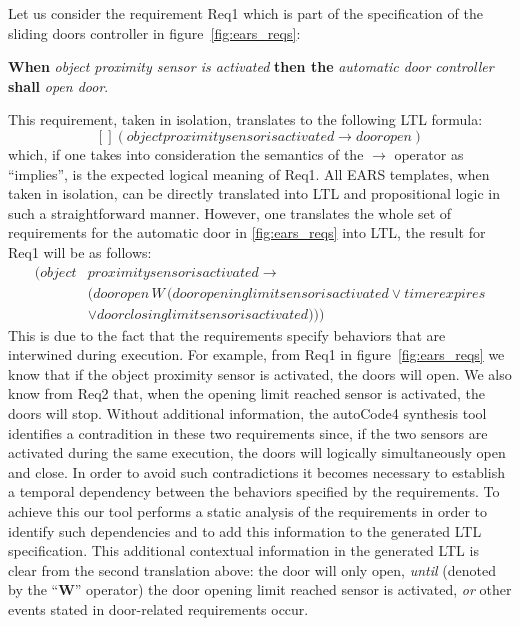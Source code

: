 Let us consider the requirement \textsf{Req1} which is part of the
specification of the sliding doors controller in figure~\ref{fig:ears_reqs}:
\begin{center}
\textbf{When} \emph{object proximity sensor is activated} \textbf{then the} \emph{automatic door controller} \textbf{shall}
\emph{open door}.
\end{center}
This requirement, taken in isolation, translates to the following LTL
 formula:
$$[] (objectproximitysensorisactivated \rightarrow dooropen)$$
which, if one takes into consideration the semantics of the $\rightarrow$
operator as ``implies'', is the expected logical meaning of \textsf{Req1}. All
EARS templates, when taken in isolation, can be directly translated into LTL and
propositional logic in such a straightforward manner. However, one translates
the whole set of requirements for the automatic door in \ref{fig:ears_reqs} into
LTL, the result for \textsf{Req1} will be as follows:
\begin{align*}
[] (object&proximitysensorisactivated \rightarrow\\
 &(dooropen\,W\,(dooropeninglimitsensorisactivated \lor timerexpires\\
 & \lor doorclosinglimitsensorisactivated )))
\end{align*}
This is due to the fact that the requirements specify behaviors that are
interwined during execution. For example, from \textsf{Req1}  in
figure~\ref{fig:ears_reqs} we know that if the \textsf{object proximity sensor}
is activated, the doors will open. We also know from \textsf{Req2} that, when
the \textsf{opening limit reached} sensor is activated, the doors will stop.
Without additional information, the \textsf{autoCode4} synthesis tool identifies
a contradition in these two requirements since, if the two sensors are activated
during the same execution, the doors will logically simultaneously open and
close. In order to avoid such contradictions it becomes necessary to establish a
temporal dependency between the behaviors specified by the requirements. To
achieve this our tool performs a static analysis of the requirements in order to
identify such dependencies and to add this information to the generated LTL
specification. This additional contextual information in the generated LTL is
clear from the second translation above:
the door will only open, \emph{until} (denoted by the ``\textbf{W}'' operator)
the door \textsf{opening limit reached} sensor is activated, \emph{or} other events
stated in door-related requirements occur.
 
